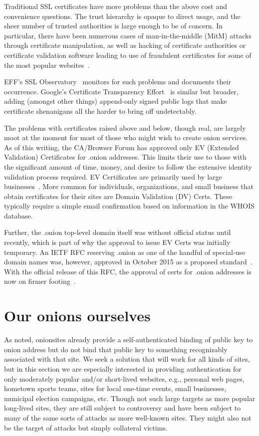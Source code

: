 \documentclass[10pt]{styles/IEEEtran}
\begin{document}
Traditional SSL certificates have more problems than
the above cost and convenience questions. The trust
hierarchy is opaque to direct usage, and the sheer number of trusted
authorities is large enough to be of concern. In particular, there
have been numerous cases of man-in-the-middle (MitM) attacks through
certificate manipulation, as well as hacking of certificate
authorities or certificate validation software leading to use of
fraudulent certificates for some of the most popular
websites~\cite{forged-ssl-oakland14}.


EFF's SSL Observatory~\cite{ssl-observatory} 
monitors for such problems and documents their occurrence.
Google's Certificate Transparency
Effort~\cite{certificate-transparency} is similar but broader,
adding (amongst other things) append-only signed public
logs that make certificate shenanigans all the harder to bring off
undetectably.

The problems with certificates raised above and below, though real,
are largely moot at the moment for most of those who might wish
to create onion services. As of this writing,
the CA/Browser Forum has approved only EV (Extended Validation)
Certificates for .onion addresses. This limits their use to those with
the significant amount of time, money, and desire to follow the
extensive identity validation process required.  EV Certificates are
primarily used by large businesses~\cite{wikipedia-ev}. More common
for individuals, organizations, and small business that obtain
certificates for their sites are Domain Validation (DV) Certs. These
typically require a simple email confirmation based on information in
the WHOIS database.  

Further, the .onion top-level domain itself was without official status until
recently, which is part of why the approval to issue EV Certs was initially
temporary. An IETF RFC reserving .onion as one of the handful of
special-use domain names was, however, approved in October 2015 as a
proposed standard~\cite{ietf-onion-tld-rfc}.  With the official
release of this RFC, the approval of certs for .onion addresses is now
on firmer footing~\cite{7686-and-all}. 


\section{Our onions ourselves}
\label{ourselves}

As noted, onionsites already provide a self-authenticated binding of
public key to onion address but do not bind that public key to
something recognizably associated with that site.  We seek a solution
that will work for all kinds of sites, but in this section we are
especially interested in providing authentication for only moderately
popular and/or short-lived websites, e.g., personal web pages,
hometown sports teams, sites for local one-time events, small
businesses, municipal election campaigns, etc.  Though not such large
targets as more popular long-lived sites, they are still subject to
controversy and have been subject to many of the same sorts of attacks
as more well-known sites.  They might also not be the target of
attacks but simply collateral victims.
\end{document}
